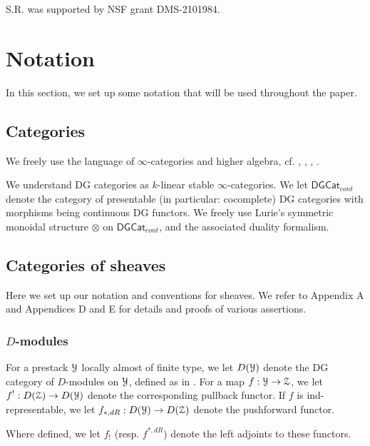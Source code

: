 \documentclass[reqno,11pt]{amsart}
\numberwithin{equation}{subsection}
\theoremstyle{remark}
\newcommand{\sY}{{\EuScript Y}}
\newcommand{\sZ}{{\EuScript Z}}
\newcommand{\DGCat}{\mathsf{DGCat}}
\begin{document}
S.R. was supported by NSF grant DMS-2101984.

\section{Notation}\label{s:notation}

In this section, we set up some notation that will be used throughout the
paper.

\subsection{Categories}

We freely use the language of $\infty$-categories and higher algebra,
cf. \cite{higheralgebra}, \cite{sag}, \cite{gr-i}, \cite{gr-ii}.

We understand DG categories as $k$-linear stable $\infty$-categories.
We let $\DGCat_{cont}$ denote the category of presentable (in particular:
cocomplete) DG categories with morphisms being continuous DG functors.
We freely use Lurie's symmetric monoidal structure $\otimes$ on
$\DGCat_{cont}$, and the associated duality formalism.

\subsection{Categories of sheaves}

Here we set up our notation and conventions for sheaves. We refer to
\cite{toy-model} Appendix A and \cite{agkrrv1} Appendices D and E for details
and proofs of various assertions.

\subsubsection{$D$-modules}

For a prestack $\sY$ locally almost of finite type, we let 
$D(\sY)$ denote the DG category of $D$-modules on $\sY$, 
defined as in \cite{gr-i}. For a map $f:\sY \to \sZ$, 
we let $f^!:D(\sZ) \to D(\sY)$ denote the corresponding pullback functor.
If $f$ is ind-representable, we let
$f_{*,dR}:D(\sY) \to D(\sZ)$ denote the pushforward functor.

Where defined, we let $f_!$ (resp. $f^{*,dR}$) denote the left adjoints
to these functors.

\subsubsection{}\label{sss:loc-cpt}
\end{document}
